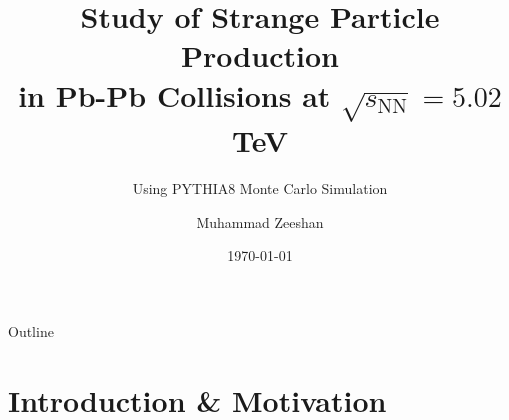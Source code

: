\documentclass[10pt, aspectratio=169]{beamer}
\title{Study of Strange Particle Production\\in Pb-Pb Collisions at $\sqrt{s_\mathrm{NN}} = 5.02$ TeV}
\subtitle{Using PYTHIA8 Monte Carlo Simulation}
\author{Muhammad Zeeshan}
\institute{Department of Physics\\[4pt]
           \textit{MPhil Physics}}
\date{\today}
\begin{document}

\maketitle

\begin{frame}{Outline}
  \tableofcontents
\end{frame}

\section{Introduction \& Motivation}
\end{document}
